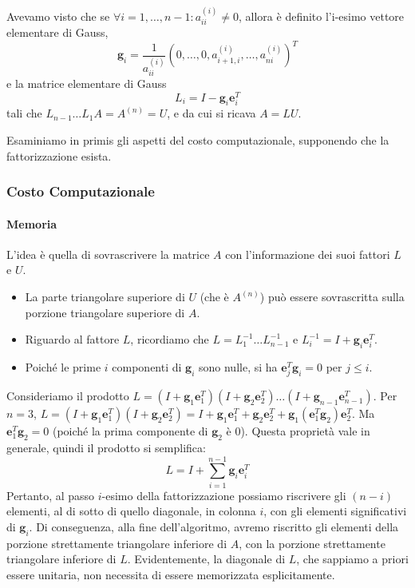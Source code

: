 Avevamo visto che se $\forall i=1, \dots, n-1 : a_{ii}^{(i)} \neq 0$, allora è definito l'i-esimo vettore elementare di Gauss,
$$ \mathbf{g}_i = \frac{1}{a_{ii}^{(i)}} (0, \dots, 0, a_{i+1,i}^{(i)}, \dots, a_{ni}^{(i)})^T $$
e la matrice elementare di Gauss
$$ L_i = I - \mathbf{g}_i \mathbf{e}_i^T $$
tali che $L_{n-1} \dots L_1 A = A^{(n)} = U$, e da cui si ricava $A = L U$.

Esaminiamo in primis gli aspetti del costo computazionale, supponendo che la fattorizzazione esista.

\subsubsection{Costo Computazionale}

\paragraph{Memoria}
L'idea è quella di sovrascrivere la matrice $A$ con l'informazione dei suoi fattori $L$ e $U$.
\begin{itemize}
    \item La parte triangolare superiore di $U$ (che è $A^{(n)}$) può essere sovrascritta sulla porzione triangolare superiore di $A$.
    \item Riguardo al fattore $L$, ricordiamo che $L = L_1^{-1} \dots L_{n-1}^{-1}$ e $L_i^{-1} = I + \mathbf{g}_i \mathbf{e}_i^T$.
    \item Poiché le prime $i$ componenti di $\mathbf{g}_i$ sono nulle, si ha $\mathbf{e}_j^T \mathbf{g}_i = 0$ per $j \le i$.
\end{itemize}
Consideriamo il prodotto $L = (I + \mathbf{g}_1 \mathbf{e}_1^T) (I + \mathbf{g}_2 \mathbf{e}_2^T) \dots (I + \mathbf{g}_{n-1} \mathbf{e}_{n-1}^T)$.
Per $n=3$, $L = (I + \mathbf{g}_1 \mathbf{e}_1^T) (I + \mathbf{g}_2 \mathbf{e}_2^T) = I + \mathbf{g}_1 \mathbf{e}_1^T + \mathbf{g}_2 \mathbf{e}_2^T + \mathbf{g}_1 (\mathbf{e}_1^T \mathbf{g}_2) \mathbf{e}_2^T$.
Ma $\mathbf{e}_1^T \mathbf{g}_2 = 0$ (poiché la prima componente di $\mathbf{g}_2$ è 0).
Questa proprietà vale in generale, quindi il prodotto si semplifica:
\begin{equation}
    L = I + \sum_{i=1}^{n-1} \mathbf{g}_i \mathbf{e}_i^T 
\end{equation}
Pertanto, al passo $i$-esimo della fattorizzazione possiamo riscrivere gli $(n-i)$ elementi, al di sotto di quello diagonale, in colonna $i$, con gli elementi significativi di $\mathbf{g}_i$.
Di conseguenza, alla fine dell'algoritmo, avremo riscritto gli elementi della porzione strettamente triangolare inferiore di $A$, con la porzione strettamente triangolare inferiore di $L$.
Evidentemente, la diagonale di $L$, che sappiamo a priori essere unitaria, non necessita di essere memorizzata esplicitamente.


